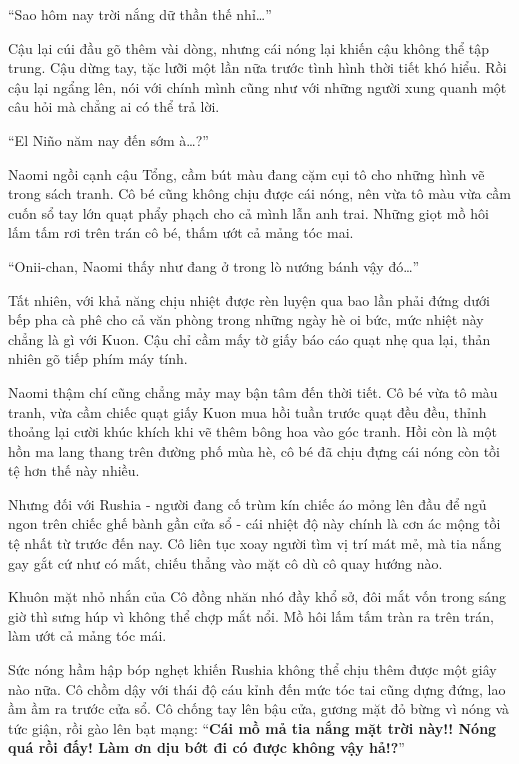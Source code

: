 \documentclass[../main.tex]{subfiles}
\begin{document}
``Sao hôm nay trời nắng dữ thần thế nhỉ\dots''

Cậu lại cúi đầu gõ thêm vài dòng, nhưng cái nóng lại khiến cậu không thể tập trung. Cậu dừng tay, tặc lưỡi một lần nữa trước tình hình thời tiết khó hiểu. Rồi cậu lại ngẩng lên, nói với chính mình cũng như với những người xung quanh một câu hỏi mà chẳng ai có thể trả lời.

``El Niño năm nay đến sớm à\dots?''

Naomi ngồi cạnh cậu Tổng, cầm bút màu đang cặm cụi tô cho những hình vẽ trong sách tranh. Cô bé cũng không chịu được cái nóng, nên vừa tô màu vừa cầm cuốn sổ tay lớn quạt phẩy phạch cho cả mình lẫn anh trai. Những giọt mồ hôi lấm tấm rơi trên trán cô bé, thấm ướt cả mảng tóc mai.

``Onii-chan, Naomi thấy như đang ở trong lò nướng bánh vậy đó\dots''

Tất nhiên, với khả năng chịu nhiệt được rèn luyện qua bao lần phải đứng dưới bếp pha cà phê cho cả văn phòng trong những ngày hè oi bức, mức nhiệt này chẳng là gì với Kuon. Cậu chỉ cầm mấy tờ giấy báo cáo quạt nhẹ qua lại, thản nhiên gõ tiếp phím máy tính.

Naomi thậm chí cũng chẳng mảy may bận tâm đến thời tiết. Cô bé vừa tô màu tranh, vừa cầm chiếc quạt giấy Kuon mua hồi tuần trước quạt đều đều, thỉnh thoảng lại cười khúc khích khi vẽ thêm bông hoa vào góc tranh. Hồi còn là một hồn ma lang thang trên đường phố mùa hè, cô bé đã chịu đựng cái nóng còn tồi tệ hơn thế này nhiều.

Nhưng đối với Rushia - người đang cố trùm kín chiếc áo mỏng lên đầu để ngủ ngon trên chiếc ghế bành gần cửa sổ - cái nhiệt độ này chính là cơn ác mộng tồi tệ nhất từ trước đến nay. Cô liên tục xoay người tìm vị trí mát mẻ, mà tia nắng gay gắt cứ như có mắt, chiếu thẳng vào mặt cô dù cô quay hướng nào.


Khuôn mặt nhỏ nhắn của Cô đồng nhăn nhó đầy khổ sở, đôi mắt vốn trong sáng giờ thì sưng húp vì không thể chợp mắt nổi. Mồ hôi lấm tấm tràn ra trên trán, làm ướt cả mảng tóc mái.

Sức nóng hầm hập bóp nghẹt khiến Rushia không thể chịu thêm được một giây nào nữa. Cô chồm dậy với thái độ cáu kỉnh đến mức tóc tai cũng dựng đứng, lao ầm ầm ra trước cửa sổ. Cô chống tay lên bậu cửa, gương mặt đỏ bừng vì nóng và tức giận, rồi gào lên bạt mạng: ``\textbf{Cái mồ mả tia nắng mặt trời này!! Nóng quá rồi đấy! Làm ơn dịu bớt đi có được không vậy hả!?}''
\end{document}
